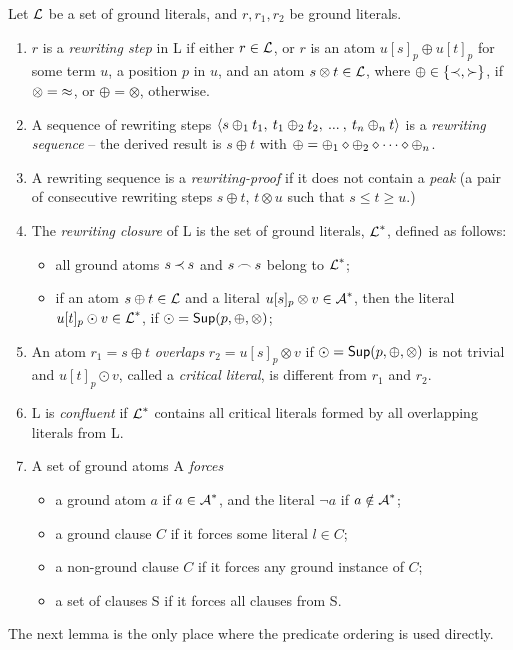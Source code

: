  \begin{definition}\label{def:ground-rewriting}
Let $\mbox {$\cal L$}$ be a set of ground literals, and $r,r_1,r_2$ be ground literals.
\begin{enumerate}\smallerspaces
\item 
$r$ is a {\em rewriting step} in \C L if either \(r\in\mbox {$\cal L$}\), or $r$ is an
atom \(u[s]_p\oplus u[t]_p\) for some term $u$, a position $p$ in $u$, and an
atom \(s\otimes t\in \mbox {$\cal L$}\), where \(\oplus\in\{\mathbin{\prec},\mathbin{\succ}\}\), if
$\otimes=\mathbin{\approx}$, or $\oplus=\otimes$, otherwise.
\item 
A sequence of rewriting steps \(\langle s\oplus_1 t_1,\: t_1\oplus_2 t_2,\:
...\:,\:t_n\oplus_n t\rangle\) is a {\em rewriting sequence} -- the derived result
is \(s\oplus t\) with \(\oplus={{{\oplus _1}\diamond{\oplus
_2}}\diamond\cdots}\diamond\oplus _n\).
\item
A rewriting sequence is a {\em rewriting-proof} if it does not contain a {\em
peak} (a pair of consecutive rewriting steps \(s\oplus t,\,t\otimes u\) such
that \(s\leq t\geq u\).)
\item
The {\em rewriting closure} of \C L is the set of ground literals, $\mbox {$\cal L$}^\ast$, defined as follows:
  \begin{itemize}\smallerspaces
  \item  all ground atoms  $s\mathbin{\prec} s$ and $s\mathbin{\frown} s$ belong to $\mbox {$\cal L$}^\ast$;
  \item if an atom \(s\oplus t\in\mbox {$\cal L$}\) and a literal \(u[s]_p\otimes v\in\mbox {$\cal A$}^\ast\), then the literal \(u[t]_p\odot v\in\mbox {$\cal L$}^\ast\), if
  \(\odot=\mbox {\sf Sup}(p,\oplus,\otimes)\);
  \end{itemize}
%
\item 
An atom \(r_1 = s\oplus t\) {\em overlaps} \(r_2 = u[s]_p\otimes v\) if
\(\odot = \mbox {\sf Sup}(p,\oplus,\otimes)\) is not trivial and \(u[t]_p \odot
v\), called a {\em critical literal}, is different from $r_1$ and $r_2$.
\item
\C L  is {\em confluent} if \(\mbox {$\cal L$}^\ast\) contains 
all critical literals formed by all overlapping %
literals from \C L.
\item 
\label {def:forcing}
A set of ground atoms \C A {\em forces}
\begin{itemize}\smallerspaces
\item a ground atom  $a$ if \(a\in\mbox {$\cal A$}^\ast\), and the literal \(\neg a\) if 
\(a\notin \mbox {$\cal A$}^\ast\);
\item a ground clause $C$ if it forces some literal \(l\in C\);
\item a non-ground clause $C$ if it forces any ground instance of $C$;
\item a set of clauses \C S if it forces all clauses from \C S.
\end{itemize}
\end{enumerate}
 \end{definition}
%
The next lemma is the only place where the predicate ordering is used
directly.


